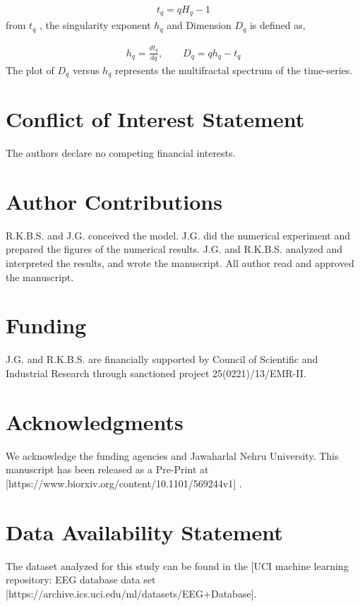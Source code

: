\documentclass[preprintnumbers,amsmath,amssymb,onecolumn]{revtex4}
\begin{document}
\begin{eqnarray}
t_{q}=qH_{q}-1
\end{eqnarray}
from $t_{q}$ , the singularity exponent $h_{q}$ and Dimension $D_{q}$ is defined as,

\begin{eqnarray}
h_{q}=\frac{dt_{q}}{dq},\quad\quad D_{q}=qh_{q}-t_{q}
\end{eqnarray}
The plot of $D_{q}$ versus $h_{q}$ represents the multifractal spectrum of the time-series.


\section{Conflict of Interest Statement}
The authors declare no competing financial interests.

\section{Author Contributions}

R.K.B.S. and J.G. conceived the model. J.G. did the numerical experiment and prepared the figures of the numerical results. J.G. and R.K.B.S. analyzed and interpreted the results, and wrote the manuscript. All author read and approved the manuscript.

\section{Funding}
J.G. and R.K.B.S. are financially supported by Council of Scientific and Industrial Research through sanctioned project 25(0221)/13/EMR-II.

\section{Acknowledgments}
We acknowledge the funding agencies and Jawaharlal Nehru University. This manuscript has been released as a Pre-Print at [https://www.biorxiv.org/content/10.1101/569244v1] \citep{Jasleen}.

\section{Data Availability Statement}
The dataset analyzed for this study can be found in the [UCI machine learning repository: EEG database data set [https://archive.ics.uci.edu/ml/datasets/EEG+Database].
\end{document}
